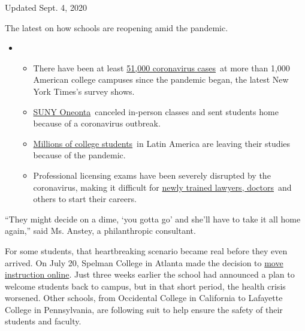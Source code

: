Updated Sept. 4, 2020

The latest on how schools are reopening amid the pandemic.

\begin{itemize}
\item
  \begin{itemize}
  \tightlist
  \item
    There have been at least
    \href{https://www.nytimes3xbfgragh.onion/interactive/2020/us/covid-college-cases-tracker.html?name=styln-coronavirus-schools-reopening\&action=click\&pgtype=Article\&state=default\&region=MAIN_CONTENT_3\&context=storylines_keepup\&region=TOP_BANNER█=storyline_menu_recirc\&action=click\&pgtype=Article\&impression_id=149dfe80-eea3-11ea-aea8-57f827c5e458\&variant=1_Show}{51,000
    coronavirus cases}~at more than 1,000 American college campuses
    since the pandemic began, the latest New York Times's survey shows.
  \item
    \href{https://www.nytimes3xbfgragh.onion/2020/09/03/nyregion/new-york-suny-oneonta-coronavirus.html?action=click\&pgtype=Article\&state=default\&region=MAIN_CONTENT_3\&context=storylines_keepup}{SUNY
    Oneonta}~canceled in-person classes and sent students home because
    of a coronavirus outbreak.
  \item
    \href{https://www.nytimes3xbfgragh.onion/2020/09/04/world/americas/latin-america-education.html?\&action=click\&pgtype=Article\&state=default\&region=MAIN_CONTENT_3\&context=storylines_keepup}{Millions
    of college students}~in Latin America are leaving their studies
    because of the pandemic.
  \item
    Professional licensing exams have been severely disrupted by the
    coronavirus, making it difficult for
    \href{https://www.nytimes3xbfgragh.onion/2020/09/04/us/bar-exam-coronavirus.html?action=click\&pgtype=Article\&state=default\&region=MAIN_CONTENT_3\&context=storylines_keepup}{newly
    trained lawyers, doctors}~and others to start their careers.
  \end{itemize}
\end{itemize}

``They might decide on a dime, `you gotta go' and she'll have to take it
all home again,'' said Ms. Anstey, a philanthropic consultant.

For some students, that heartbreaking scenario became real before they
even arrived. On July 20, Spelman College in Atlanta made the decision
to \href{https://www.spelman.edu/academics/path-forward-2020-21}{move
instruction online}. Just three weeks earlier the school had announced a
plan to welcome students back to campus, but in that short period, the
health crisis worsened. Other schools, from Occidental College in
California to Lafayette College in Pennsylvania, are following suit to
help ensure the safety of their students and faculty.

